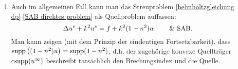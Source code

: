 \begin{counter bem plain}
\begin{enumerate}[label=(\roman*)]
		\item Auch im allgemeinen Fall kann man das Streuproblem \eqref{helmholtzgleichung dp}-\eqref{SAB direktes problem} als Quellproblem auffassen:
		\begin{equation*}
			\Delta u^s+k^2u^s=f+k^2(1-n^2)u\qquad\text{ \& SAB}.
		\end{equation*}
		Man kann zeigen (mit dem Prinzip der eindeutigen Fortsetzbarkeit), dass \(\operatorname{supp}\big((1-n^2)u\big)=\operatorname{supp}(1-n^2)\), d.h. der zugehörige konvexe Quellträger \(\operatorname{csupp}(u^\infty)\) beschreibt tatsächlich den Brechungsindex und die Quelle.
	\end{enumerate}
\end{counter bem plain}




































